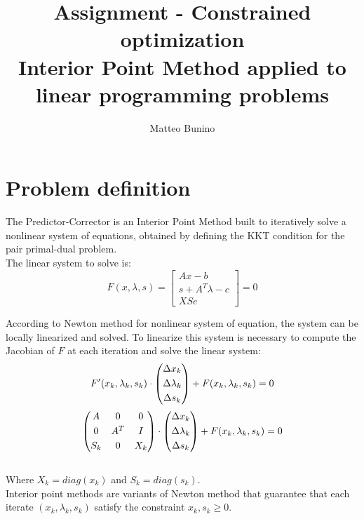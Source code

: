 \documentclass[]{article}
\title{Assignment - Constrained optimization\\Interior Point Method applied to linear programming
	problems}
\author{Matteo Bunino}
\begin{document}
\maketitle

\section{Problem definition}
The Predictor-Corrector is an Interior Point Method built to iteratively solve a nonlinear system of equations, obtained by defining the KKT condition for the pair primal-dual problem.\\
The linear system to solve is:
\begin{equation*}
	F(x,\lambda, s) = 
	\begin{bmatrix}
	Ax-b \\[0.3em]
	s+A^T\lambda-c \\[0.3em]
	XSe          
	\end{bmatrix}
	=0
\end{equation*}

According to Newton method for nonlinear system of equation, the system can be locally linearized and solved. To linearize this system is necessary to compute the Jacobian of $F$ at each iteration and solve the linear system:
\begin{equation*}
	F'(x_k,\lambda_k, s_k) \cdot 
	\begin{pmatrix}
	\Delta x_k \\[0.3em]
	\Delta \lambda_k \\[0.3em]
	\Delta s_k           
	\end{pmatrix}
	+ F(x_k,\lambda_k, s_k)=0\\
\end{equation*}
\begin{equation*}
\begin{pmatrix}
A & 0 & 0 \\[0.3em]
0 & A^T & I \\[0.3em]
S_k & 0 & X_k           
\end{pmatrix}
\cdot 
\begin{pmatrix}
\Delta x_k \\[0.3em]
\Delta \lambda_k \\[0.3em]
\Delta s_k           
\end{pmatrix}
+ F(x_k,\lambda_k, s_k)=0\\
\end{equation*}
\\
Where $X_k=diag(x_k)$ and $S_k=diag(s_k)$.\\
Interior point methods are variants of Newton method that guarantee that each iterate $(x_k, \lambda_k, s_k)$ satisfy the constraint $x_k, s_k\geq0$.
\pagebreak
\end{document}
